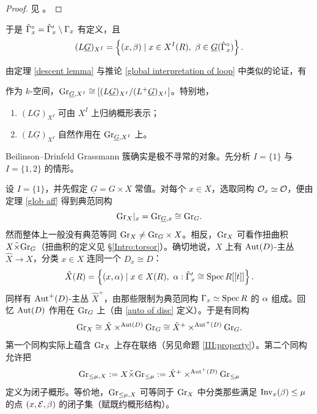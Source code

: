 \begin{proof}见 \cite[Proposition 2.12.6]{BD}。
\end{proof}

于是 $\hat{{\Gamma}}_x^\circ=\hat{{\Gamma}}'_x\setminus {\Gamma}_x$ 有定义，且
\begin{equation}
(L\underline G)_{X^I}=\left\{(x,\beta)\mid x\in X^I(R),\ \beta\in
\underline G(\hat{{\Gamma}}^\circ_x)\right\}.
\end{equation}

由定理 \ref{descent lemma} 与推论 \ref{global interpretation of loop} 中类似的论证，有

\begin{prop}
作为 $k$-空间，${\operatorname{Gr}}_{\underline G,X^I}\cong[(L\underline G)_{X^I}/(L^+\underline G)_{X^I}]$。特别地，
\begin{enumerate}
\item $(L\underline G)_{X^I}$ 可由 $X^I$ 上归纳概形表示；
\item $(L\underline G)_{X^I}$ 自然作用在 ${\operatorname{Gr}}_{\underline G,X^I}$ 上。
\end{enumerate}
\end{prop}

Beilinson--Drinfeld Grassmann 簇确实是极不寻常的对象。先分析 $I=\{1\}$ 与 $I=\{1,2\}$ 的情形。

设 $I=\{1\}$，并先假定 $\underline G=G\times X$ 常值。对每个 $x\in X$，选取同构 ${\mathcal O}_x\simeq {\mathcal O}$，便由定理 \ref{glob aff} 得到典范同构
\[{\operatorname{Gr}}_{X}|_x={\operatorname{Gr}}_{\underline G, x}\cong {\operatorname{Gr}}_{G}.\]
然而整体上一般没有典范等同 ${\operatorname{Gr}}_X\neq {\operatorname{Gr}}_G\times X$。相反，${\operatorname{Gr}}_X$ 可看作扭曲积 $X\tilde\times{\operatorname{Gr}}_G$（扭曲积的定义见 \S\ref{Intro:torsor}）。确切地说，$X$ 上有 ${\operatorname{Aut}}(D)$-主丛 $\hat{X}\to X$，分类 $x\in X$ 连同一个 $D_x\cong D$：
\[\hat{X}(R)=\left\{(x,\al)\mid x\in X(R),\ \al: \hat{\Ga}'_x\cong \Spec R[[t]]\right\}.\]
同样有 ${\operatorname{Aut}}^+(D)$-主丛 $\hat{X}^+$，由那些限制为典范同构 ${\Gamma}_x\simeq \operatorname{Spec} R$ 的 ${\alpha}$ 组成。回忆 ${\operatorname{Aut}}(D)$ 作用在 ${\operatorname{Gr}}_G$ 上（由 \eqref{auto of disc} 定义）。于是有同构
\begin{equation}\label{III: twisted constr}
{\operatorname{Gr}}_X\cong \hat{X}\times^{{\operatorname{Aut}}(D)}{\operatorname{Gr}}_G\cong \hat{X}^+\times^{{\operatorname{Aut}}^+(D)}{\operatorname{Gr}}_G.
\end{equation}
第一个同构实际上蕴含 ${\operatorname{Gr}}_X$ 上存在联络（另见命题 \ref{III:property}）。第二个同构允许把
\begin{equation}\label{III:SV over X}
{\operatorname{Gr}}_{\leq \mu,X}: =X\tilde\times {\operatorname{Gr}}_{\leq \mu}:=\hat{X}^+\times^{{\operatorname{Aut}}^+(D)}{\operatorname{Gr}}_{\leq \mu}
\end{equation}
定义为闭子概形。等价地，${\operatorname{Gr}}_{\leq \mu,X}$ 可等同于 ${\operatorname{Gr}}_X$ 中分类那些满足 ${\operatorname{Inv}}_x(\beta)\leq \mu$ 的点 $(x,{\mathcal E},\beta)$ 的闭子集（赋既约概形结构）。

